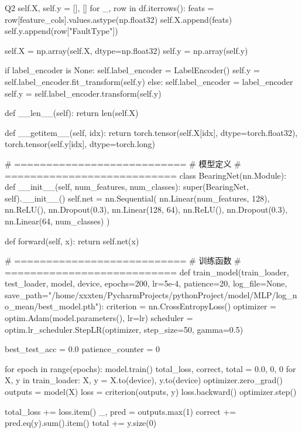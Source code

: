 \begin{Python}{Q2}
        self.X, self.y = [], []
        for _, row in df.iterrows():
            feats = row[feature_cols].values.astype(np.float32)
            self.X.append(feats)
            self.y.append(row["FaultType"])

        self.X = np.array(self.X, dtype=np.float32)
        self.y = np.array(self.y)

        if label_encoder is None:
            self.label_encoder = LabelEncoder()
            self.y = self.label_encoder.fit_transform(self.y)
        else:
            self.label_encoder = label_encoder
            self.y = self.label_encoder.transform(self.y)

    def __len__(self):
        return len(self.X)

    def __getitem__(self, idx):
        return torch.tensor(self.X[idx], dtype=torch.float32), torch.tensor(self.y[idx], dtype=torch.long)


# ===========================
# 模型定义
# ===========================
class BearingNet(nn.Module):
    def __init__(self, num_features, num_classes):
        super(BearingNet, self).__init__()
        self.net = nn.Sequential(
            nn.Linear(num_features, 128),
            nn.ReLU(),
            nn.Dropout(0.3),
            nn.Linear(128, 64),
            nn.ReLU(),
            nn.Dropout(0.3),
            nn.Linear(64, num_classes)
        )

    def forward(self, x):
        return self.net(x)


# ===========================
# 训练函数
# ===========================
def train_model(train_loader, test_loader, model, device, epochs=200, lr=5e-4, patience=20,
                log_file=None, save_path="/home/xxxten/PycharmProjects/pythonProject/model/MLP/log_no_mean/best_model.pth"):
    criterion = nn.CrossEntropyLoss()
    optimizer = optim.Adam(model.parameters(), lr=lr)
    scheduler = optim.lr_scheduler.StepLR(optimizer, step_size=50, gamma=0.5)

    best_test_acc = 0.0
    patience_counter = 0

    for epoch in range(epochs):
        model.train()
        total_loss, correct, total = 0.0, 0, 0
        for X, y in train_loader:
            X, y = X.to(device), y.to(device)
            optimizer.zero_grad()
            outputs = model(X)
            loss = criterion(outputs, y)
            loss.backward()
            optimizer.step()

            total_loss += loss.item()
            _, pred = outputs.max(1)
            correct += pred.eq(y).sum().item()
            total += y.size(0)


\end{Python}
